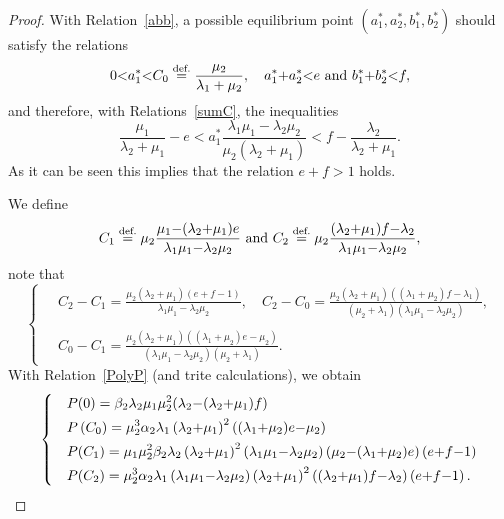 \documentclass[10pt,a4paper]{amsart}
\newcommand\steq[1]{\stackrel{\text{\rm #1.}}{=}}
\begin{document}
\begin{proof}
With Relation~\eqref{abb}, a possible equilibrium point $(a_1^*,a_2^*,b_1^*,b_2^*)$ should satisfy the relations
\begin{equation}\label{feq1}
0{<} a_1^*{<} C_0\steq{def}\frac{\mu_2}{\lambda_1  + \mu_2}, \quad a_1^*{+}a_2^*{<}e \text{ and } b_1^*{+}b_2^*{<}f,
\end{equation}
and therefore, with Relations~\eqref{sumC}, the inequalities
\begin{equation}\label{feq12}
\frac{\mu_1}{\lambda_2  + \mu_1}{-}e < a_1^*\frac{\lambda_1\mu_1{-}\lambda_2\mu_2}{\mu_2(\lambda_2  + \mu_1)}
< f{-} \frac{\lambda_2}{\lambda_2  +\mu_1}.
\end{equation}
As it can be seen this implies that the relation $e{+}f{>}1$ holds. 

We define
\[
C_1\steq{def}\mu_2\frac{\mu_1{-}(\lambda_2{+}\mu_1)e}{\lambda_1\mu_1{-}\lambda_2\mu_2} \text{ and } C_2\steq{def}\mu_2\frac{(\lambda_2{+}\mu_1)f{-} \lambda_2}{\lambda_1\mu_1{-}\lambda_2\mu_2},
\]
note that
\begin{equation}\label{Ineq}
\begin{cases}
&C_2{-}C_1{=}\displaystyle\frac{\mu_2(\lambda_2{+}\mu_1)(e{+}f{-}1)}{\lambda_1\mu_1{-}\lambda_2\mu_2}, \quad C_2{-}C_0{=}\frac{\mu_2  \left(\lambda_2  +\mu_1  \right) \left((\lambda_1{+}\mu_2)f{-} \lambda_1 \right)}{\left(\mu_2  +\lambda_1  \right) \left(\lambda_1  \mu_1{-}\lambda_2  \mu_2  \right)},\\
\ \\
 &C_0{-}C_1{=}\displaystyle\frac{\mu_2(\lambda_2{+}\mu_1)((\lambda_1{+}\mu_2)e{-}\mu_2)}{(\lambda_1\mu_1{-}\lambda_2\mu_2)(\mu_2{+}\lambda_1)}.
\end{cases}
\end{equation}
With Relation~\eqref{PolyP} (and trite calculations), we obtain
\begin{equation}\label{RelP}
\begin{cases}
&P(0)\displaystyle=\beta_2  \lambda_2  \mu_1 \mu_2^{2} (\lambda_2{-}(\lambda_2{+}\mu_1)f )\smallskip\\
&P\left(C_0\right)\displaystyle=\mu_2^{3} \alpha_2  \lambda_1  \left(\lambda_2 {+}\mu_1  \right)^{2} \left((\lambda_1{+}\mu_2)e  {-}\mu_2  \right)\smallskip\\
&P(C_1)\displaystyle=\mu_1 \mu_2^{2} \beta_2  \lambda_2  \left(\lambda_2{+}\mu_1  \right)^{2} \left(\lambda_1  \mu_1  {-}\lambda_2  \mu_2  \right) \left(\mu_2{-}(\lambda_1{+} \mu_2)e\right) \left(e{+}f{-}1\right)\smallskip\\
&P(C_2)\displaystyle=\mu_2^{3} \alpha_2  \lambda_1\left(\lambda_1  \mu_1  {-}\lambda_2  \mu_2\right)  \left(\lambda_2 {+}\mu_1  \right)^{2} \left((\lambda_2{+}\mu_1)f  {-}\lambda_2  \right) \left(e{+}f{-}1\right).
\end{cases}
\end{equation}


\end{proof}
\end{document}
